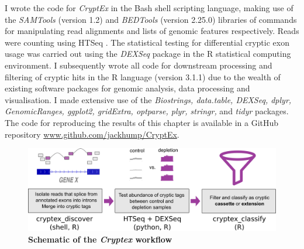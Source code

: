 I wrote the code for \textit{CryptEx} in the Bash shell scripting language, making use of the \emph{SAMTools} (version 1.2) \citep{Li2009-hm} and \emph{BEDTools} (version 2.25.0) \citep{Quinlan2010-up} libraries of commands for manipulating read alignments and lists of genomic features respectively. Reads were counting using HTSeq \citep{Anders2015-wz}. The statistical testing for differential cryptic exon usage was carried out using the \textit{DEXSeq} package \citep{Anders2012} in the R statistical computing environment. I subsequently wrote all code for downstream processing and filtering of cryptic hits in the R language (version 3.1.1) due to the wealth of existing software packages for genomic analysis, data processing and visualisation. I made extensive use of the \emph{Biostrings, data.table, DEXSeq, dplyr, GenomicRanges, ggplot2, gridExtra, optparse, plyr, stringr,} and \emph{tidyr} packages. The code for reproducing the results of this chapter is available in a GitHub repository \url{www.github.com/jackhump/CryptEx}.

\begin{figure}
	\centering
	\includegraphics[width=14cm]{Figures/03_cryptic_exons/cryptex_pipeline.png}
	\caption{\textbf{Schematic of the \textit{Cryptex} workflow}}
	\label{fig:cryptic_workflow}
\end{figure}

